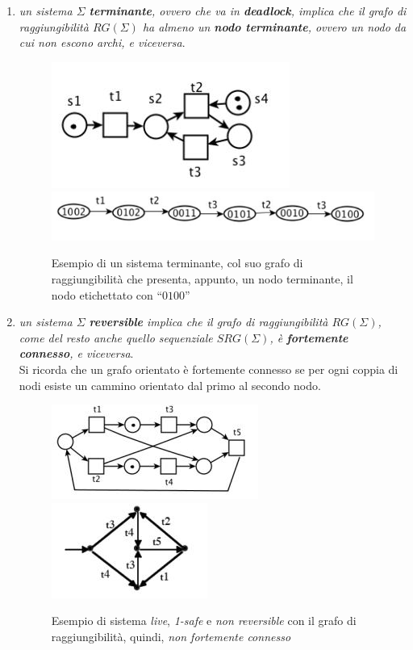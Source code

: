 \documentclass[a4paper,12pt, oneside]{book}
\begin{document}
\begin{enumerate}
  \item \textit{un sistema $\Sigma$ \textbf{terminante}, ovvero che va in
    \textbf{deadlock}, implica che il grafo di raggiungibilità $RG(\Sigma)$ ha
    almeno un \textbf{nodo terminante}, ovvero un nodo da cui non escono archi,
    e viceversa}.
  \begin{figure}[H]
    \centering
    \includegraphics[scale = 0.6]{img/ptc12a.jpg}
    \includegraphics[scale = 0.6]{img/ptc12b.jpg}
    \caption{Esempio di un sistema terminante, col suo grafo di raggiungibilità
      che presenta, appunto, un nodo terminante, il nodo etichettato con
      ``$0100$''}
  \end{figure}
  \item \textit{un sistema $\Sigma$ \textbf{reversible} implica che il grafo di
    raggiungibilità $RG(\Sigma)$, come del resto anche quello sequenziale
    $SRG(\Sigma)$, è \textbf{fortemente connesso}, e viceversa}.\\
  Si ricorda che un grafo orientato è fortemente connesso se per ogni coppia di
  nodi esiste un cammino orientato dal primo al secondo nodo.
  \begin{figure}[H]
    \centering
    \includegraphics[scale = 0.7]{img/ptc13.jpg}
    \includegraphics[scale = 0.7]{img/ptc14.jpg}
    \caption{Esempio di sistema \emph{live}, \emph{1-safe} e \emph{non
        reversible} con il grafo di raggiungibilità, quindi, \emph{non
        fortemente connesso}} 
  \end{figure}
\end{enumerate}
\end{document}
